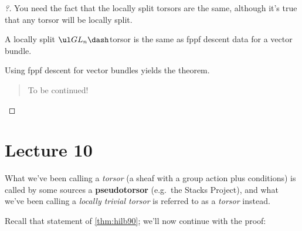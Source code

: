 \begin{proof}[?]

You need the fact that the locally split torsors are the same, although
it's true that any torsor will be locally split.

\begin{claim}

A locally split \(\ul GL_n\dash\)torsor is the same as fppf descent data
for a vector bundle.

\end{claim}

Using fppf descent for vector bundles yields the theorem.

\begin{quote}
To be continued!
\end{quote}

\end{proof}

\hypertarget{lecture-10}{%
\section{Lecture 10}\label{lecture-10}}

\begin{remark}

What we've been calling a \emph{torsor} (a sheaf with a group action
plus conditions) is called by some sources a \textbf{pseudotorsor}
(e.g.~the Stacks Project), and what we've been calling a \emph{locally
trivial torsor} is referred to as a \emph{torsor} instead.

\end{remark}

Recall that statement of \cref{thm:hilb90}; we'll now continue with the
proof:

